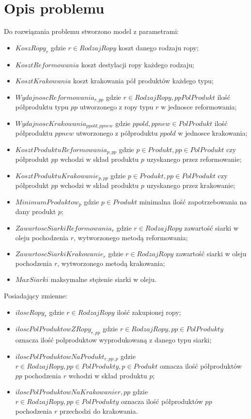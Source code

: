 \section{Opis problemu}
Do rozwiązania problemu stworzono model z parametrami: 
\begin{itemize}
    \item $KoszRopy_{r}$ gdzie $r \in RodzajRopy$ koszt danego rodzaju ropy;
    \item $KosztReformowania$ koszt destylacji ropy każdego rodzaju;
    \item $KosztKrakowania$ koszt krakowania pół produktów każdego typu;
    \item $WydajnoscReformowania_{r, pp}$ gdzie $r \in RodzajRopy, pp PolProdukt$ ilość półproduktu typu $pp$ utworzonego z ropy typu $r$ w jednosce reformowania;
    \item $WydajnoscKrakowania_{ppold, ppnew}$ gdzie $ppold, ppnew \in PolProdukt$ ilość półproduktu $ppnew$ utworzonego z półproduktu $ppold$ w jednosce krakowania;
    \item $KosztProduktuReformowania_{p, pp}$ gdzie $p \in Produkt, pp \in PolProdukt$ czy półprodukt $pp$ wchodzi w skład produktu $p$ uzyskanego przez reformowanie;
    \item $KosztProduktuKrakowanie_{p,pp}$ gdzie $p \in Produkt, pp \in PolProdukt$ czy półprodukt $pp$ wchodzi w skład produktu $p$ uzyskanego przez krakowanie;
    \item $MinimumProduktow_{p}$ gdzie $p \in Produkt$ minimalna ilość zapotrzebowania na dany produkt $p$;
    \item $ZawartoscSiarkiReformowania_{r}$ gdzie $r \in RodzajRopy$ zawartość siarki w oleju pochodzenia $r$, wytworzonego metodą reformowania;
    \item $ZawartoscSiarkiKrakowanie_{r}$ gdzie  $r \in RodzajRopy$ zawartość siarki w oleju pochodzenia $r$, wytworzonego metodą krakowania;
    \item $MaxSiarki$ maksymalne stężenie siarki w oleju.
\end{itemize}

Posiadający zmienne:

\begin{itemize}
    \item $iloscRopy_{r}$ gdzie $r \in RodzajRopy$ ilość zakupionej ropy;
    \item $iloscPolProduktowZRopy_{r, pp}$ gdzie $r \in RodzajRopy, pp \in PolProdukty$ oznacza ilość polproduktow wyprodukowaną z danego typu siarki;
    \item $iloscPolProduktowNaProdukt_{r, pp, p}$ gdzie $r \in RodzajRopy, pp \in PolProdukty, p \in Produkt$ oznacza ilość półproduktów $pp$ pochodzenia $r$ wchodzi w skład produktu $p$;
    \item $iloscPolProduktowNaKrakowanie{r, pp}$ gdzie $r \in RodzajRopy, pp \in PolProdukty$ oznacza ilość półproduktów $pp$ pochodzenia $r$ przechodzi do krakowania.
\end{itemize}

